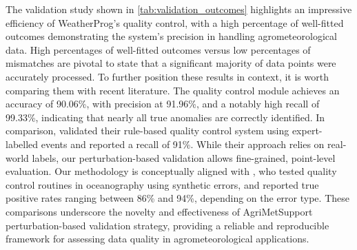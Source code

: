 \documentclass[authoryear,preprint,review,12pt]{elsarticle}
\newcommand{\statusblock}[3]{
    \ifthenelse{\equal{#2}{todo}}
        {\textcolor{red}{#1 (TO DO): #3}}
        {}
    \ifthenelse{\equal{#2}{wip}}
        {\textcolor{magenta}{#1 (IN PROGRESS): #3}}
        {}
    \ifthenelse{\equal{#2}{update}}
        {\textcolor{blue}{#1 (UPDATE): #3}}
        {}
    \ifthenelse{\equal{#2}{review}}
        {\textcolor{cyan}{#1 (REVIEW): #3}}
        {}
    \ifthenelse{\equal{#2}{done}}
        {\textcolor{PineGreen}{#1 (READY): #3}}
        {}
}
\begin{document}
The validation study shown in \cref{tab:validation_outcomes} highlights an impressive efficiency of WeatherProg's quality control, with a high percentage of well-fitted outcomes demonstrating the system's precision in handling agrometeorological data. 
High percentages of well-fitted outcomes versus low percentages of mismatches are pivotal to state that a significant majority of data points were accurately processed. 
To further position these results in context, it is worth comparing them with recent literature. The quality control module achieves an accuracy of 90.06\%, with precision at 91.96\%, and a notably high recall of 99.33\%, indicating that nearly all true anomalies are correctly identified.
In comparison, \citet{QC-temperature-ML-2024} validated their rule-based quality control system using expert-labelled events and reported a recall of 91\%. 
While their approach relies on real-world labels, our perturbation-based validation allows fine-grained, point-level evaluation. %
Our methodology is conceptually aligned with \citet{QC-good2023}, who tested quality control routines in oceanography using synthetic errors, and reported true positive rates ranging between 86\% and 94\%, depending on the error type.
These comparisons underscore the novelty and effectiveness of AgriMetSupport perturbation-based validation strategy, providing a reliable and reproducible framework for assessing data quality in agrometeorological applications.%
\end{document}
